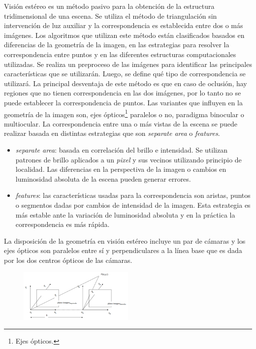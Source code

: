 Visión estéreo es un método pasivo para la obtención de la estructura tridimensional de una escena. Se utiliza el método de triangulación sin intervención de luz auxiliar y la correspondencia es establecida entre dos o más imágenes.
Los algoritmos que utilizan este método están clasificados basados en diferencias de la geometría de la imagen, en las estrategias para resolver la correspondencia entre puntos y en las diferentes estructuras computacionales utilizadas\cite{StereoReview}.
Se realiza un preproceso de las imágenes para identificar las principales características que se utilizarán. Luego, se define qué tipo de correspondencia se utilizará.
La principal desventaja de este método es que en caso de oclusión, hay regiones que no tienen correspondencia en las dos imágenes, por lo tanto no se puede establecer la correspondencia de puntos.
Las variantes que influyen en la geometría de la imagen son, ejes ópticos\footnote{Ejes ópticos.} paralelos o no, paradigma binocular o multiocular.
La correspondencia entre una o más vistas de la escena se puede realizar basada en distintas estrategias que son \emph{separate area} o \emph{features}.
\begin{itemize}
   \item \emph{separate area}: basada en correlación del brillo e intensidad. Se utilizan patrones de brillo aplicados a un \emph{pixel} y sus vecinos utilizando principio de localidad. Las diferencias en la perspectiva de la imagen o cambios en luminosidad absoluta de la escena pueden generar errores.
   \item \emph{features}: las características usadas para la correspondencia son aristas, puntos o segmentos dadas por cambios de intensidad de la imagen. Esta estrategia es más estable ante la variación de luminosidad absoluta y en la práctica la correspondencia es más rápida.
\end{itemize}
La disposición de la geometría en visión estéreo incluye un par de cámaras y los ejes ópticos son paralelos entre sí y perpendiculares a la línea base que es dada por los dos centros ópticos de las cámaras.

\begin{figure}[H]
  \centering
    \includegraphics[width=0.5\textwidth]{./Cap6_reconstruccion/stereo.PNG}
  \caption{}
  \label{fig:Stereo}
\end{figure}

